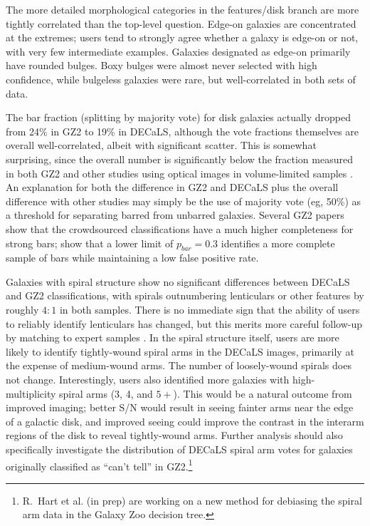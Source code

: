 \documentclass[iop,apj,tighten]{emulateapj}
\begin{document}
The more detailed morphological categories in the features/disk branch are more tightly correlated than the top-level question. Edge-on galaxies are concentrated at the extremes; users tend to strongly agree whether a galaxy is edge-on or not, with very few intermediate examples. Galaxies designated as edge-on primarily have rounded bulges. Boxy bulges were almost never selected with high confidence, while bulgeless galaxies were rare, but well-correlated in both sets of data. 

The bar fraction (splitting by majority vote) for disk galaxies actually dropped from 24\% in GZ2 to 19\% in DECaLS, although the vote fractions themselves are overall well-correlated, albeit with significant scatter. This is somewhat surprising, since the overall number is significantly below the fraction measured in both GZ2 \citep{mas11c} and other studies using optical images in volume-limited samples \citep[eg,][]{bar08,agu09,lee12}. An explanation for both the difference in GZ2 and DECaLS plus the overall difference with other studies may simply be the use of majority vote (eg, 50\%) as a threshold for separating barred from unbarred galaxies. Several GZ2 papers \citep{hoy11,wil13} show that the crowdsourced classifications have a much higher completeness for strong bars; \citet{gal15} show that a lower limit of $p_{bar}=0.3$ identifies a more complete sample of bars while maintaining a low false positive rate.

Galaxies with spiral structure show no significant differences between DECaLS and GZ2 classifications, with spirals outnumbering lenticulars or other features by roughly $4:1$ in both samples. There is no immediate sign that the ability of users to reliably identify lenticulars has changed, but this merits more careful follow-up by matching to expert samples \citep[eg,][]{nai10}. In the spiral structure itself, users are more likely to identify tightly-wound spiral arms in the DECaLS images, primarily at the expense of medium-wound arms. The number of loosely-wound spirals \citep[which correlates strongly with the presence of a merger; see][]{cas13} does not change. Interestingly, users also identified more galaxies with high-multiplicity spiral arms (3, 4, and $5+$). This would be a natural outcome from improved imaging; better S/N would result in seeing fainter arms near the edge of a galactic disk, and improved seeing could improve the contrast in the interarm regions of the disk to reveal tightly-wound arms. Further analysis should also specifically investigate the distribution of DECaLS spiral arm votes for galaxies originally classified as ``can't tell'' in GZ2.\footnote{R.~Hart et al. (in prep) are working on a new method for debiasing the spiral arm data in the Galaxy Zoo decision tree.}
\end{document}
